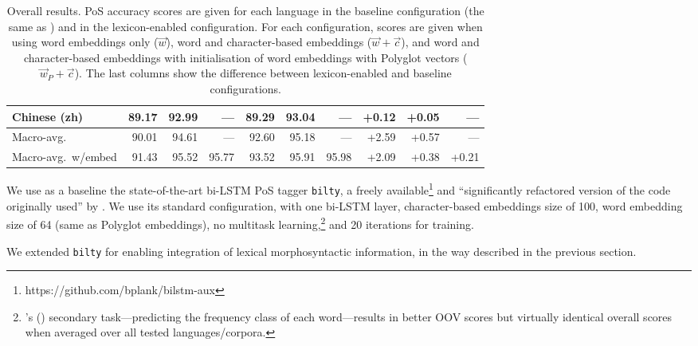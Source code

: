 \documentclass[11pt,a4paper]{article}
\newcommand\hm[1]{\textcolor{blue}{#1}}
\newcommand\bs[1]{\textcolor{red}{#1}}
\newcommand\discussion[1]{}
\begin{document}
\begin{table}[t]
\begin{tabular}{l|rrr|rrr|rrr}
Chinese (zh) & 89.17 & 92.99 & --- & 89.29 & 93.04 & --- & +0.12 & +0.05 & ---\\
\midrule
Macro-avg. & 90.01 & 94.61 & --- & 92.60 & 95.18 & --- & +2.59 & +0.57 & ---\\
Macro-avg.~w/embed & 91.43 & 95.52 & 95.77 & 93.52 & 95.91 & 95.98 & +2.09 & +0.38 & +0.21\\
\end{tabular}
\caption{Overall results. PoS accuracy scores are given for each language in the baseline
  configuration (the same as \citealp{plank16}) and in the lexicon-enabled configuration. For each configuration, scores
are given when using word embeddings only ($\vec{w}$), word and character-based embeddings ($\vec{w}+\vec{c}$), and word
and character-based embeddings with initialisation of word embeddings with Polyglot vectors ($\vec{w}_P+\vec{c}$). The
 last columns show the difference between lexicon-enabled and baseline configurations.{}}\label{tbl:results}
\end{table}

\discussion{\hm{\textbf{HM What about "We use the bi-LSTM system described in Section 2"?}}\bs{\textbf{We don't need to
      reduce that much in fact. So I suggest we keep this paragraph as is}}} We use as a baseline the state-of-the-art
bi-LSTM PoS tagger \texttt{bilty}, a freely available\footnote{https://github.com/bplank/bilstm-aux} and ``significantly
refactored version of the code originally used'' by \citet{plank16}. We use its standard configuration, with one bi-LSTM
layer, character-based embeddings size of 100, word embedding size of 64 (same as Polyglot embeddings), no multitask
learning,\footnote{\citeauthor{plank16}'s (\citeyear{plank16}) secondary task---predicting the frequency class of each
  word---results in better OOV scores but virtually identical overall scores when averaged over all tested
  languages/corpora.} and 20 iterations for training.

We extended \texttt{bilty} for enabling integration of lexical morphosyntactic information, in the way described in the
previous section.%
\end{document}
